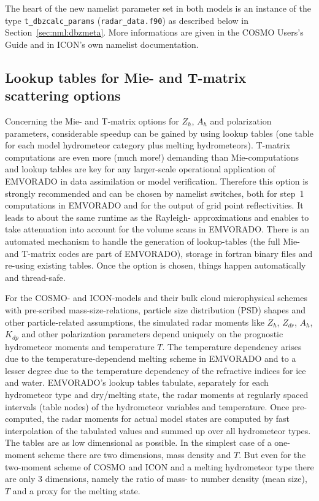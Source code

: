 \documentclass[10pt,a4paper,twoside,headinclude,footinclude,parskip=half]{scrartcl}
\newcommand{\myaktuellesection}{sec:intro}%
\newcommand{\labelsec}[1]{\label{#1}\renewcommand{\myaktuellesection}{#1}}%
\newcommand{\labelsec}[1]{\label{#1}}%
\newcommand{\srcform}[1]{\mbox{\texttt{#1}}\xspace}%
\begin{document}
The heart of the new namelist parameter set in both models is an instance of the type \srcform{t_dbzcalc_params} (\srcform{radar_data.f90}) as described below in Section~\ref{sec:nml:dbzmeta}. More informations are given in the COSMO Users's Guide and in ICON's own namelist documentation.


\subsection{Lookup tables for Mie- and T-matrix scattering options}

\labelsec{sec:intro:lookup}

Concerning the Mie- and T-matrix options for $Z_h$, $A_h$ and polarization parameters, considerable speedup can be gained by using lookup tables (one table for
each model hydrometeor category plus melting hydrometeors). T-matrix computations are even more (much more!) demanding than Mie-computations and lookup tables are key
for any larger-scale operational application of EMVORADO in data assimilation or model verification.
Therefore this option is strongly recommended and can be chosen by namelist switches, both for step~1 computations in EMVORADO and
for the output of grid point reflectivities. It leads to about the same runtime as the Rayleigh-
approximations and enables to take attenuation into account for the volume scans in EMVORADO.
There is an automated mechanism to handle the generation of lookup-tables (the full Mie- and T-matrix codes are part of EMVORADO), storage in fortran binary files and re-using existing tables.
Once the option is chosen, things happen automatically and thread-safe. 

For the COSMO- and ICON-models and their bulk cloud microphysical schemes with pre-scribed mass-size-relations, particle size distribution (PSD) shapes and other particle-related assumptions,
the simulated radar moments like  $Z_h$, $Z_{dr}$, $A_h$, $K_{dp}$ and other polarization parameters
depend uniquely on the prognostic hydrometeor moments and temperature $T$. The temperature dependency arises due to the temperature-dependend melting scheme in EMVORADO
and to a lesser degree due to the temperature dependency of the refractive indices for ice and water. EMVORADO's lookup tables tabulate, separately for each hydrometeor type and dry/melting state, the radar moments at regularly spaced
intervals (table nodes) of the hydrometeor variables and temperature. Once pre-computed, the radar moments for actual model states are computed by fast interpolation of the tabulated values and summed up over all hydrometeor types.
The tables are as low dimensional as possible. In the simplest case of a one-moment scheme there are two dimensions, mass density and $T$. But even for the two-moment scheme of COSMO and ICON and a melting hydrometeor type there are only 3 dimensions,
namely the ratio of mass- to number density (mean size), $T$ and a proxy for the melting state.
\end{document}
